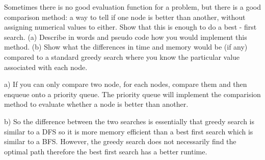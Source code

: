 \documentclass[12pt]{article}
\makeatletter
\newenvironment{problem}{\@startsection
  {section}
  {1}
  {-.2em}
  {-3.5ex plus -1ex minus -.2ex}
  {2.3ex plus .2ex}
  {
    \large\bf\noindent{Problem }
  }
}
\makeatother
\begin{document}
\begin{problem}{}
	\color{gray}
 Sometimes there is no good evaluation function for a problem, but there is a good comparison method:
a way to tell if one node is better than another, without assigning numerical values to either. Show that
this is enough to do a best - ﬁrst search. (a) Describe in words and pseudo code how you would implement this method. (b) Show what the differences in time and memory would be (if any) compared to
a standard greedy search where you know the particular value associated with each node.\\
	\color{black}

\begin{description}
\item{a)} If you can only compare two node, for each nodes, compare
  them and then enqueue onto a priority queue.  The priority queue
  will implement the comparision method to evaluate whether a node is
  better than another.\\
\item{b)} So the difference between the two searches is essentially
  that greedy search is similar to a DFS so it is more memory
  efficient than a best first search which is similar to a BFS.
  However, the greedy search does not necessarily find the optimal path
  therefore the best first search has a better runtime.
\end{description}
\end{problem}
\end{document}
